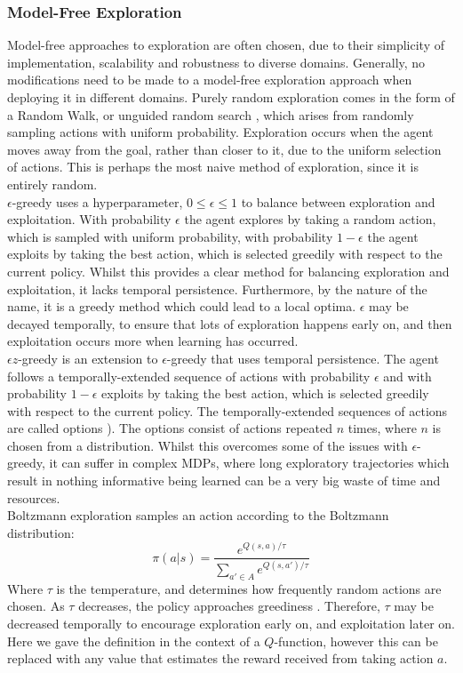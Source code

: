 \subsubsection{Model-Free Exploration}
Model-free approaches to exploration are often chosen, due to their simplicity of implementation, scalability and robustness to diverse domains. Generally, no modifications need to be made to a model-free exploration approach when deploying it in different domains.
Purely random exploration comes in the form of a Random Walk, or unguided random search \cite{anderson86}, which arises from randomly sampling actions with uniform probability. Exploration occurs when the agent moves away from the goal, rather than closer to it, due to the uniform selection of actions. This is perhaps the most naive method of exploration, since it is entirely random.
\\$\epsilon$-greedy \cite{Watkins:1989, conf/nips/Sutton95} uses a hyperparameter, $0 \le \epsilon \le 1$ to balance between exploration and exploitation. With probability $\epsilon$ the agent explores by taking a random action, which is sampled with uniform probability, with probability $1-\epsilon$ the agent exploits by taking the best action, which is selected greedily with respect to the current policy. Whilst this provides a clear method for balancing exploration and exploitation, it lacks temporal persistence. Furthermore, by the nature of the name, it is a greedy method which could lead to a local optima. $\epsilon$ may be decayed temporally, to ensure that lots of exploration happens early on, and then exploitation occurs more when learning has occurred.
\\$\epsilon z$-greedy \cite{dabney2021temporallyextended} is an extension to $\epsilon$-greedy that uses temporal persistence. The agent follows a temporally-extended sequence of actions with probability $\epsilon$ and with probability $1-\epsilon$ exploits by taking the best action, which is selected greedily with respect to the current policy. The temporally-extended sequences of actions are called options \cite{SUTTON1999181}). The options consist of actions repeated $n$ times, where $n$ is chosen from a distribution. Whilst this overcomes some of the issues with $\epsilon$-greedy, it can suffer in complex MDPs, where long exploratory trajectories which result in nothing informative being learned can be a very big waste of time and resources.
\\ Boltzmann exploration samples an action according to the Boltzmann distribution:
\begin{equation}
\label{eqn:boltzmann}
\pi(a|s) = \frac{e^{Q(s,a)/\tau}}{\sum_{a' \in A}e^{Q(s,a')/\tau}}
\end{equation}
Where $\tau$ is the temperature, and determines how frequently random actions are chosen. As $\tau$ decreases, the policy approaches greediness \cite{DBLP:journals/corr/cs-AI-9605103, DBLP:journals/corr/abs-2109-00157}. Therefore, $\tau$ may be decreased temporally to encourage exploration early on, and exploitation later on. Here we gave the definition in the context of a $Q$-function, however this can be replaced with any value that estimates the reward received from taking action $a$.
